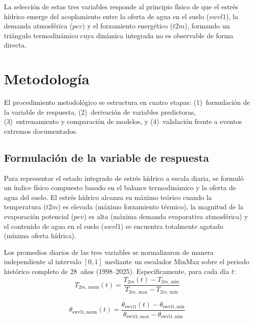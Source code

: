 \documentclass[12pt, a4paper]{article}
\begin{document}
La selección de estas tres variables responde al principio físico de que el estrés hídrico emerge del acoplamiento entre la oferta de agua en el suelo ($swvl1$), la demanda atmosférica ($pev$) y el forzamiento energético ($t2m$), formando un triángulo termodinámico cuya dinámica integrada no es observable de forma directa.

\section{Metodología}
\label{sec:metodologia}

El procedimiento metodológico se estructura en cuatro etapas: (1)~formulación de la variable de respuesta, (2)~derivación de variables predictoras, (3)~entrenamiento y comparación de modelos, y (4)~validación frente a eventos extremos documentados.

\subsection{Formulación de la variable de respuesta}
\label{subsec:target}

Para representar el estado integrado de estrés hídrico a escala diaria, se formuló un índice físico compuesto basado en el balance termodinámico y la oferta de agua del suelo. El estrés hídrico alcanza su máximo teórico cuando la temperatura ($t2m$) es elevada (máximo forzamiento térmico), la magnitud de la evaporación potencial ($pev$) es alta (máxima demanda evaporativa atmosférica) y el contenido de agua en el suelo ($swvl1$) se encuentra totalmente agotado (mínima oferta hídrica). 

Los promedios diarios de las tres variables se normalizaron de manera independiente al intervalo $[0, 1]$ mediante un escalador MinMax sobre el periodo histórico completo de 28~años (1998--2025). Específicamente, para cada día $t$:
%
\begin{equation}
    T_{2m,\,\text{norm}}(t) = \frac{T_{2m}(t) - T_{2m,\,\text{min}}}{T_{2m,\,\text{max}} - T_{2m,\,\text{min}}}
\end{equation}

\begin{equation}
    \theta_{\text{swvl1},\,\text{norm}}(t) = \frac{\theta_{\text{swvl1}}(t) - \theta_{\text{swvl1},\,\text{min}}}{\theta_{\text{swvl1},\,\text{max}} - \theta_{\text{swvl1},\,\text{min}}}
\end{equation}
\end{document}
